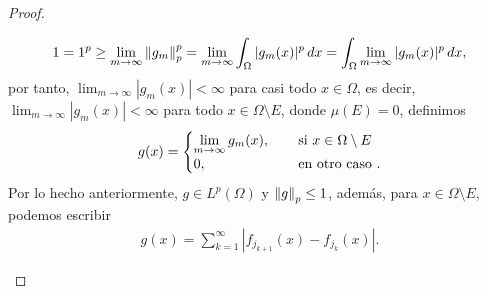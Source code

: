 \begin{proof}
\begin{itemize}
        \begin{align*}
            1=1^p\geq \lim_{m\to \infty}\left\|g_m\right\|_p^p=\lim_{m\to \infty}\int_{\Omega}|g_m(x)|^p\, dx=\int_{\Omega}\lim_{m\to \infty}|g_m(x)|^p\, dx,
        \end{align*}
        por tanto, $\displaystyle \lim_{m\to \infty}|g_m(x)|<\infty$ para casi todo $x \in \Omega$, es decir, $\displaystyle \lim_{m\to \infty}|g_m(x)|<\infty$ para todo $x\in \Omega\setminus E$, donde $\mu(E)=0$, definimos
        \begin{align*}
            g(x)=\begin{cases}
                \displaystyle \lim_{m\to \infty}g_m(x), \hspace{3mm} &\text{ si } x\in \Omega\setminus E\\
                0, &\text{ en otro caso }.
            \end{cases}
        \end{align*}
        Por lo hecho anteriormente, $g\in L^p(\Omega)$ y $\left\|g\right\|_p\leq 1$, además, para $x \in \Omega\setminus E$, podemos escribir
        \begin{align*}
            g(x)=\sum_{k=1}^\infty|f_{j_{k+1}}(x)-f_{j_k}(x)|.
        \end{align*}
        

\end{itemize}
\end{proof}
